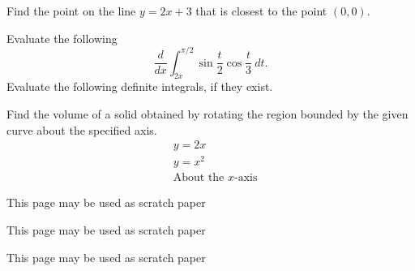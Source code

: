 \documentclass[11pt, addpoints]{exam}
\begin{document}
\begin{questions}
\pagebreak

\question[10] Find the point on the line $y=2x+3$ that is closest to the point $(0,0)$.
\vfill

\pagebreak

\question[10] Evaluate the following
\[\frac{d}{dx} \int_{2x}^{\pi/2} \sin{\frac{t}{2}}\cos{\frac{t}{3}} \ dt.\]
\vfill
\question Evaluate the following definite integrals, if they exist.

\pagebreak

\question[20] Find the volume of a solid obtained by rotating the region bounded by the given curve about the specified axis.
\begin{align*}
    & y = 2x \\
    & y = x^2\\
    & \text{About the $x$-axis}
\end{align*}
\end{questions}
\pagebreak
This page may be used as scratch paper

\pagebreak
This page may be used as scratch paper

\pagebreak
This page may be used as scratch paper




\end{document}
